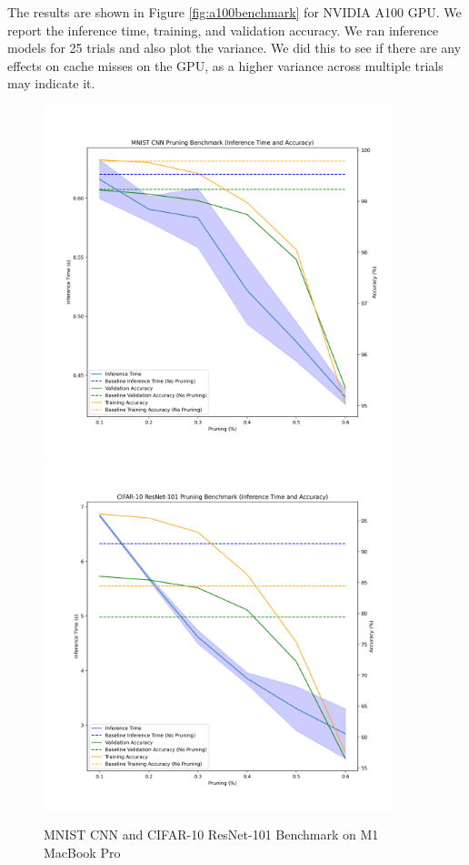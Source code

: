 \documentclass{article}
\begin{document}
The results are shown in Figure \ref{fig:a100benchmark} for NVIDIA A100 GPU. We report the inference time, training, and validation accuracy. We ran inference models for 25 trials and also plot the variance. We did this to see if there are any effects on cache misses on the GPU, as a higher variance across multiple trials may indicate it.

\begin{figure}
    \centerline{
        \includegraphics[width=4in]{../proj1/figures/mnist_cnn_benchmarkm1.png}
        \includegraphics[width=4in]{../proj1/figures/resnet101_benchmarkm1.png}
    }
    \caption{MNIST CNN and CIFAR-10 ResNet-101 Benchmark on M1 MacBook Pro}
    \label{fig:m1benchmark}
\end{figure}
\end{document}
